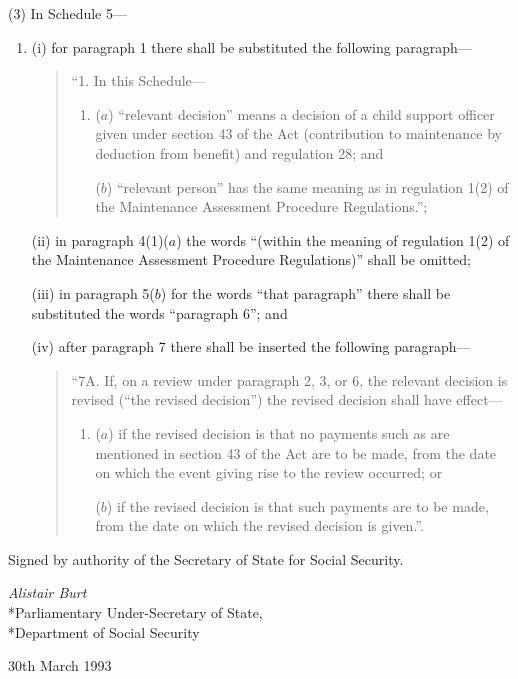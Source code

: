 \documentclass[a4paper]{article}
\begin{document}
(3) In Schedule 5—
\begin{enumerate}\item[]
(i) for paragraph 1 there shall be substituted the following paragraph—
\begin{quotation}
“1.  In this Schedule—
\begin{enumerate}\item[]
($a$) “relevant decision” means a decision of a child support officer given under section 43 of the Act (contribution to maintenance by deduction from benefit) and regulation 28; and

($b$) “relevant person” has the same meaning as in regulation 1(2) of the Maintenance Assessment Procedure Regulations.”;
\end{enumerate}
\end{quotation}

(ii) in paragraph 4(1)($a$) the words “(within the meaning of regulation 1(2) of the Maintenance Assessment Procedure Regulations)” shall be omitted;

(iii) in paragraph 5($b$) for the words “that paragraph” there shall be substituted the words “paragraph 6”; and

(iv) after paragraph 7 there shall be inserted the following paragraph—
\begin{quotation}
“7A.  If, on a review under paragraph 2, 3, or 6, the relevant decision is revised (“the revised decision”) the revised decision shall have effect—
\begin{enumerate}\item[]
($a$) if the revised decision is that no payments such as are mentioned in section 43 of the Act are to be made, from the date on which the event giving rise to the review occurred; or

($b$) if the revised decision is that such payments are to be made, from the date on which the revised decision is given.”.
\end{enumerate}
\end{quotation}
\end{enumerate}

\bigskip

Signed by authority of the Secretary of State for Social Security.

{\raggedleft
\emph{Alistair Burt}\\*Parliamentary Under-Secretary of State,\\*Department of Social Security

}

30th March 1993
\end{document}

